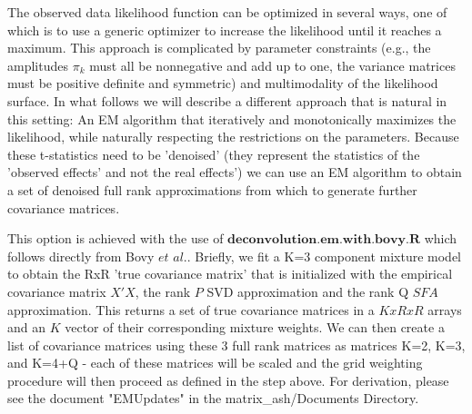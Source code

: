 \documentclass[10pt]{article}
\newcommand{\etal}{\textit{et al.}} %
\begin{document}
The observed data likelihood function can be optimized in several ways, one of which is to use a generic optimizer to increase the likelihood until it reaches a maximum. This approach is complicated by parameter constraints (e.g., the amplitudes $\pi_{k}$ must all be nonnegative and add up to one, the variance matrices must be positive definite and symmetric) and multimodality of the likelihood surface. In what follows we will describe a different approach that is natural in this setting: An EM algorithm that iteratively and monotonically maximizes the likelihood, while naturally respecting the restrictions on the parameters.
Because these t-statistics need to be 'denoised' (they represent the statistics of the 'observed effects' and not the real effects') we can use an EM algorithm to obtain a set of denoised full rank approximations from which to generate further covariance matrices. 

This option is achieved with the use of $\textbf{deconvolution.em.with.bovy.R}$ which follows directly from Bovy $\etal$. Briefly, we fit a K=3 component mixture model to obtain the RxR 'true covariance matrix' that is initialized with the empirical covariance matrix $X'X$, the rank $P$ SVD approximation and the rank Q $SFA$ approximation. This returns a set of true covariance matrices in a $KxRxR$ arrays and an $K$ vector of their corresponding mixture weights. We can then create a list of covariance matrices using these 3 full rank matrices as matrices K=2, K=3, and K=4+Q - each of these matrices will be scaled and the grid weighting procedure will then proceed as defined in the step above. For derivation, please see the document "EMUpdates" in the matrix_ash/Documents Directory.
\end{document}
